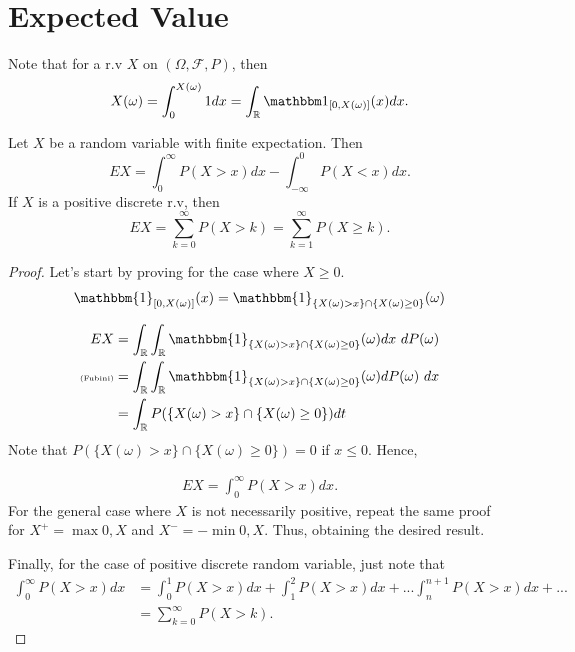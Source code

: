 \newpage
\section{Expected Value}

\begin{lemma}
	Note that for a r.v $X$ on $(\Omega, \mathcal F, P)$, then
	\begin{equation}
		X(\omega) = \int_0^{X(\omega)} 1 dx =
		\int_\mathbb R \mathbbm 1_{[0,X(\omega)]}(x) dx.
		\label{eq:cake}
	\end{equation}
\end{lemma}

\begin{theorem}
	Let $X$ be a random variable with finite expectation. Then
	\begin{equation}
		E X =
		\int_0^\infty P(X > x) dx - \int_{-\infty}^0 P(X<x) dx.
	\end{equation}
	If $X$ is a positive discrete r.v, then
	\begin{equation}
		E X = \displaystyle\sum_{k=0}^{\infty}P(X > k) = \displaystyle\sum_{k=1}^{\infty}P(X\geq k).
	\end{equation}
\end{theorem}
\begin{proof}
	Let's start by proving for the case where $X\geq 0$.
	\begin{align*}
		\mathbbm{1}_{[0,X(\omega)]}(x) =
		\mathbbm{1}_{\{X(\omega)>x\} \cap \{X(\omega) \geq 0\}}(\omega)
	\end{align*}

	\begin{align*}
		E X                    & =
		\int_\mathbb R \int_\mathbb R
		\mathbbm{1}_{\{X(\omega)>x\} \cap \{X(\omega) \geq 0\}}(\omega) dx \ d P(\omega) \\
		{\text{\tiny(Fubini)}} & =
		\int_\mathbb R \int_\mathbb R
		\mathbbm{1}_{\{X(\omega)>x\} \cap \{X(\omega) \geq 0\}}(\omega) d P(\omega) \ dx \\
		                       & =
		\int_\mathbb R P(\{X(\omega)> x\} \cap \{X(\omega) \geq 0\})dt                   \\
	\end{align*}
	Note that $P(\{X(\omega)> x\} \cap \{X(\omega) \geq 0\})=0$ if $x\leq 0$. Hence,

	\begin{align*}
		E X = \int_0^\infty P(X > x) dx.
	\end{align*}
	For the general case where $X$ is not necessarily positive,
	repeat the same proof for $X^+ = \max{0,X}$ and $X^- = -\min{0,X}$. Thus, obtaining the desired result.

	Finally, for the case of positive discrete random variable,
	just note that
	\begin{align*}
		\int_0^\infty P(X > x) dx & =
		\int_0^1 P(X > x) dx +
		\int_1^2 P(X > x) dx +
		...
		\int_n^{n+1} P(X > x) dx + ...                          \\
		                          & = \sum^\infty_{k=0} P(X>k).
	\end{align*}
\end{proof}

